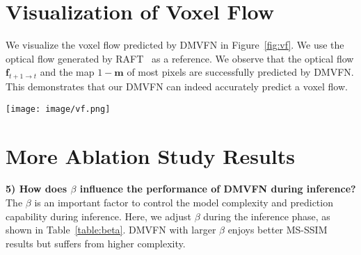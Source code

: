 \documentclass[10pt,twocolumn,letterpaper]{article}
\begin{document}
\section{Visualization of Voxel Flow}
We visualize the voxel flow predicted by DMVFN in Figure~\ref{fig:vf}.
We use the optical flow generated by RAFT~\cite{raft} as a reference.
We observe that the optical flow $\textbf{f}_{t+1 \rightarrow t}$ and the map $1-\textbf{m}$ of most pixels are successfully predicted by DMVFN.
This demonstrates that our DMVFN can indeed accurately predict a voxel flow.
\label{sec:vf}
\begin{figure*}[h]
\vspace{4mm}
	\centering
	\texttt{[image: image/vf.png]}
 \caption{\textbf{Visualization} of the map $1-\textbf{m}$, the optical flow $\textbf{f}_{t+1 \rightarrow t}$, the optical flow by RAFT~\cite{raft} $\textbf{f}^{RAFT}_{t+1 \rightarrow t}$, the predicted frame $\tilde{I}_{t+1}$ and the “ground truth” $I_{t+1}$.}
        \label{fig:vf}
	\vspace{-2mm}
\end{figure*}


\section{More Ablation Study Results}
\label{sec:more_ab}


\noindent
\textbf{5) How does $\beta$ influence the performance of DMVFN during inference?} The $\beta$ is an important factor to control the model complexity and prediction capability during inference. Here, we adjust $\beta$ during the inference phase, as shown in Table~\ref{table:beta}. DMVFN with larger $\beta$ enjoys better MS-SSIM results but suffers from higher complexity.

\begin{table}[th]
\caption{\textbf{Results of DMVFN with different $\beta$}\ evaluated on KITTI benchmark~\cite{kitti}.}
\centering
{}
\label{table:beta}
\end{table}
\end{document}
